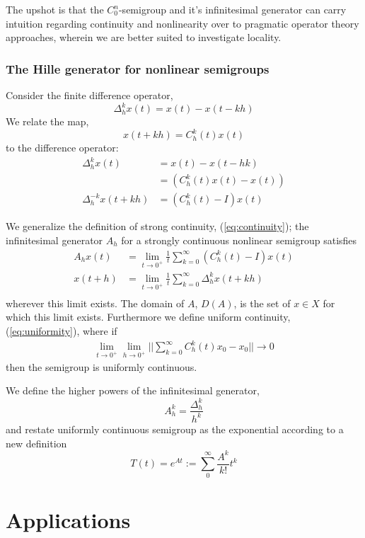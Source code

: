 \documentclass{article}
\begin{document}
The upshot is that the $C^n_0$-semigroup and it's infinitesimal generator can carry intuition regarding continuity and nonlinearity over to pragmatic operator theory approaches, wherein we are better suited to investigate locality.

\subsubsection{The Hille generator for nonlinear semigroups}
Consider the finite difference operator,
$$
    \Delta^k_h x(t) = x(t) - x(t-kh)
$$
We relate the map,
$$
    x(t+kh) = C^k_h(t) x(t)
$$
to the difference operator:
\begin{align}
    \Delta^{k}_h x(t) &= x(t) - x(t-hk) \nonumber\\
    &= \left(C^k_h(t) x(t) - x(t)\right) \nonumber\\
    \Delta^{-k}_h x(t+kh) &= \left(C^{k}_h(t) - I\right) x(t)
\end{align}

We generalize the definition of strong continuity, (\ref{eq:continuity}); the infinitesimal generator $A_h$ for a strongly continuous nonlinear semigroup satisfies
\begin{align*}
    A_h x(t) &= \lim_{t\rightarrow0^+}  \frac{1}{t}  \sum_{k=0}^\infty (C^k_h(t) - I) x(t)\\
    x(t+h) &= \lim_{t\rightarrow0^+} \frac{1}{t}  \sum_{k=0}^\infty  \Delta^k_h x(t+kh) \\
\end{align*}
wherever this limit exists. The domain of $A$, $D(A)$, is the set of $x\in X$ for which this limit exists. Furthermore we define uniform continuity, (\ref{eq:uniformity}), where if
\begin{align*}
    \lim_{t\rightarrow0^+} \lim_{h\rightarrow0^+} || \sum_{k=0}^\infty C^k_h(t) x_0 - x_0 || \rightarrow 0
\end{align*}
then the semigroup is uniformly continuous.



We define the higher powers of the infinitesimal generator,
$$
A^k_h = \frac{\Delta^k_h}{h^k}
$$
and restate uniformly continuous semigroup as the exponential according to a new definition
$$
    T(t) = e^{At} := \sum_0^{\infty} \frac{A^k}{k!} t^k \label{eq:generator}
$$

\section{Applications}
\end{document}
